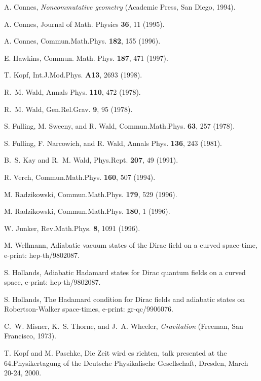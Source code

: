 \documentclass[a4paper,10pt,oneside]{amsart}
\theoremstyle{plain}
\theoremstyle{definition}
\theoremstyle{remark}
\begin{document}
\begin{thebibliography}{10}

A. Connes, {\em Noncommutative geometry} (Academic Press, San
Diego, 1994).

A. Connes, Journal of Math. Physics {\bf 36},  11  (1995).

A. Connes, Commun.Math.Phys. {\bf 182},  155  (1996).

E. Hawkins, Commun. Math. Phys. {\bf 187},  471  (1997).

T. Kopf, Int.J.Mod.Phys. {\bf A13},  2693  (1998).

R.~M. Wald, Annals Phys. {\bf 110},  472  (1978).

R.~M. Wald, Gen.Rel.Grav. {\bf 9},  95  (1978).

S. Fulling, M. Sweeny, and R. Wald, Commun.Math.Phys. {\bf 63},
257  (1978).

S. Fulling, F. Narcowich, and R. Wald, Annals Phys. {\bf 136},
243  (1981).

B.~S. Kay and R.~M. Wald, Phys.Rept. {\bf 207},  49  (1991).

R. Verch, Commun.Math.Phys. {\bf 160},  507  (1994).

M. Radzikowski, Commun.Math.Phys. {\bf 179},  529  (1996).

M. Radzikowski, Commun.Math.Phys. {\bf 180},  1  (1996).

W. Junker, Rev.Math.Phys. {\bf 8},  1091  (1996).

M. Wellmann, Adiabatic vacuum states of the Dirac field on a
curved space-time,
  e-print: hep-th/9802087.

S. Hollands, Adiabatic Hadamard states for Dirac quantum fields on
a curved
  space, e-print: hep-th/9802087.

S. Hollands, The Hadamard condition for Dirac fields and adiabatic
states on
  Robertson-Walker space-times, e-print: gr-qc/9906076.

C.~W. Misner, K.~S. Thorne, and J.~A. Wheeler, {\em Gravitation}
(Freeman, San
  Francisco, 1973).

T. Kopf and M. Paschke, Die Zeit wird es richten, talk presented
at the
  64.Physikertagung of the Deutsche Physikalische Gesellschaft, Dresden, March
  20-24, 2000.


\end{thebibliography}
\end{document}
